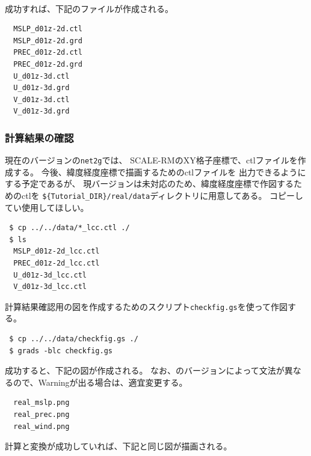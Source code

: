 \\

成功すれば、下記のファイルが作成される。
\begin{verbatim}
  MSLP_d01z-2d.ctl
  MSLP_d01z-2d.grd
  PREC_d01z-2d.ctl
  PREC_d01z-2d.grd
  U_d01z-3d.ctl
  U_d01z-3d.grd
  V_d01z-3d.ctl
  V_d01z-3d.grd
\end{verbatim}


\subsubsection{計算結果の確認}
現在のバージョンの\verb|net2g|では、
SCALE-RMのXY格子座標で、ctlファイルを作成する。
今後、緯度経度座標で描画するためのctlファイルを
出力できるようにする予定であるが、
現バージョンは未対応のため、緯度経度座標で作図するためのctlを
\verb|${Tutorial_DIR}/real/data|ディレクトリに用意してある。
コピーしてい使用してほしい。
\begin{verbatim}
 $ cp ../../data/*_lcc.ctl ./
 $ ls
  MSLP_d01z-2d_lcc.ctl
  PREC_d01z-2d_lcc.ctl
  U_d01z-3d_lcc.ctl
  V_d01z-3d_lcc.ctl
\end{verbatim}

計算結果確認用の図を作成するためのスクリプト\verb|checkfig.gs|を使って作図する。
\begin{verbatim}
 $ cp ../../data/checkfig.gs ./
 $ grads -blc checkfig.gs
\end{verbatim}
成功すると、下記の図が作成される。
なお、\grads のバージョンによって文法が異なるので、Warningが出る場合は、適宜変更する。
\begin{verbatim}
  real_mslp.png
  real_prec.png
  real_wind.png
\end{verbatim}
計算と変換が成功していれば、下記と同じ図が描画される。

